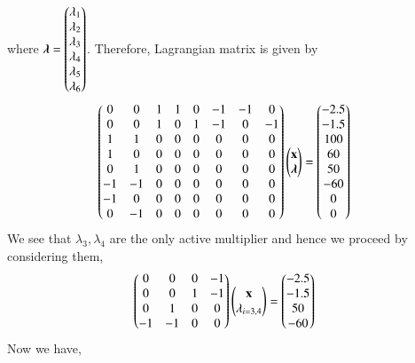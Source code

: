 \documentclass[journal,12pt,twocolumn]{IEEEtran}
\begin{document}
where $\boldsymbol{\lambda}=\begin{pmatrix}\lambda_1 \\ \lambda_2 \\ \lambda_3 \\ \lambda_4 \\ \lambda_5 \\ \lambda_6\end{pmatrix} $. Therefore, Lagrangian matrix is given by
\begin{align}
    \begin{pmatrix}0 & 0 & 1 & 1 & 0 & -1 & -1 & 0 \\ 0 & 0 & 1 & 0 & 1 & -1 & 0 & -1 \\ 1 & 1 & 0 & 0 & 0 & 0 & 0 & 0 \\ 1 & 0 & 0 & 0 & 0 & 0 & 0 & 0 \\ 0 & 1 & 0 & 0 & 0 & 0 & 0 & 0 \\ -1 & -1 & 0 & 0 & 0 & 0 & 0 & 0 \\ -1 & 0 & 0 & 0 & 0 & 0 & 0 & 0 \\ 0 & -1 & 0 & 0 & 0 & 0 & 0 & 0 \end{pmatrix}\begin{pmatrix}\mathbf{x} \\ \boldsymbol{\lambda}\end{pmatrix} &= \begin{pmatrix}-2.5 \\ -1.5 \\ 100 \\ 60 \\ 50 \\ -60 \\0 \\ 0 \end{pmatrix}
\end{align}
We see that $\lambda_3,\lambda_4$ are the only active multiplier and hence we proceed by considering them,
\begin{align}
    \begin{pmatrix}0 & 0 & 0 & -1 \\ 0 & 0 & 1 & -1 \\ 0 & 1 & 0 & 0 \\ -1 & -1 & 0 & 0\end{pmatrix}\begin{pmatrix}\mathbf{x}\\ \lambda_{i=3,4}\end{pmatrix} &= \begin{pmatrix}-2.5 \\ -1.5 \\ 50 \\ -60\end{pmatrix}
\end{align}
Now we have,
\end{document}
